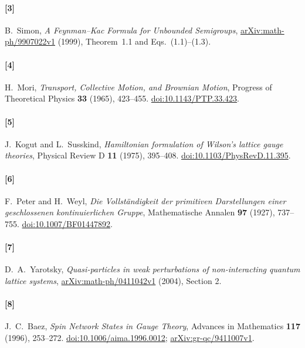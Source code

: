 \documentclass[11pt]{article}
\begin{document}
\paragraph{[3]}
B.~Simon, \emph{A Feynman--Kac Formula for Unbounded Semigroups},
\href{https://arxiv.org/abs/math-ph/9907022v1}{arXiv:math-ph/9907022v1}
(1999), Theorem~1.1 and Eqs.~(1.1)--(1.3).
\paragraph{[4]}
H.~Mori, \emph{Transport, Collective Motion, and Brownian Motion},
Progress of Theoretical Physics \textbf{33} (1965), 423--455.
\href{https://doi.org/10.1143/PTP.33.423}{doi:10.1143/PTP.33.423}.
\paragraph{[5]}
J.~Kogut and L.~Susskind,
\emph{Hamiltonian formulation of Wilson's lattice gauge theories},
Physical Review D \textbf{11} (1975), 395--408.
\href{https://doi.org/10.1103/PhysRevD.11.395}{doi:10.1103/PhysRevD.11.395}.
\paragraph{[6]}
F.~Peter and H.~Weyl,
\emph{Die Vollst\"andigkeit der primitiven Darstellungen einer
geschlossenen kontinuierlichen Gruppe},
Mathematische Annalen \textbf{97} (1927), 737--755.
\href{https://doi.org/10.1007/BF01447892}{doi:10.1007/BF01447892}.
\paragraph{[7]}
D.~A.~Yarotsky, \emph{Quasi-particles in weak perturbations of
non-interacting quantum lattice systems},
\href{https://arxiv.org/abs/math-ph/0411042v1}{arXiv:math-ph/0411042v1}
(2004), Section 2.
\paragraph{[8]}
J.~C.~Baez, \emph{Spin Network States in Gauge Theory},
Advances in Mathematics \textbf{117} (1996), 253--272.
\href{https://doi.org/10.1006/aima.1996.0012}{doi:10.1006/aima.1996.0012};
\href{https://arxiv.org/abs/gr-qc/9411007v1}{arXiv:gr-qc/9411007v1}.
\end{document}
